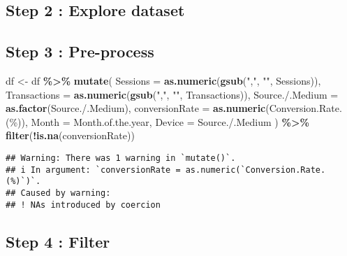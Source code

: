 \documentclass[
]{article}
\newenvironment{Shaded}{\begin{snugshade}}{\end{snugshade}}
\newcommand{\AttributeTok}[1]{\textcolor[rgb]{0.13,0.29,0.53}{#1}}
\newcommand{\FunctionTok}[1]{\textcolor[rgb]{0.13,0.29,0.53}{\textbf{#1}}}
\newcommand{\NormalTok}[1]{#1}
\newcommand{\OtherTok}[1]{\textcolor[rgb]{0.56,0.35,0.01}{#1}}
\newcommand{\SpecialCharTok}[1]{\textcolor[rgb]{0.81,0.36,0.00}{\textbf{#1}}}
\newcommand{\StringTok}[1]{\textcolor[rgb]{0.31,0.60,0.02}{#1}}
\begin{document}
\subsection{Step 2 : Explore dataset}\label{step-2-explore-dataset-1}

\subsection{Step 3 : Pre-process}\label{step-3-pre-process}

\begin{Shaded}
\begin{Highlighting}[]
\NormalTok{df }\OtherTok{\textless{}{-}}\NormalTok{ df }\SpecialCharTok{\%\textgreater{}\%}
  \FunctionTok{mutate}\NormalTok{(}
    \AttributeTok{Sessions =} \FunctionTok{as.numeric}\NormalTok{(}\FunctionTok{gsub}\NormalTok{(}\StringTok{","}\NormalTok{, }\StringTok{""}\NormalTok{, Sessions)),}
    \AttributeTok{Transactions =} \FunctionTok{as.numeric}\NormalTok{(}\FunctionTok{gsub}\NormalTok{(}\StringTok{","}\NormalTok{, }\StringTok{""}\NormalTok{, Transactions)),}
    \StringTok{\textasciigrave{}}\AttributeTok{Source./.Medium}\StringTok{\textasciigrave{}} \OtherTok{=} \FunctionTok{as.factor}\NormalTok{(}\StringTok{\textasciigrave{}}\AttributeTok{Source./.Medium}\StringTok{\textasciigrave{}}\NormalTok{),}
    \AttributeTok{conversionRate =} \FunctionTok{as.numeric}\NormalTok{(}\StringTok{\textasciigrave{}}\AttributeTok{Conversion.Rate.(\%)}\StringTok{\textasciigrave{}}\NormalTok{),}
    \AttributeTok{Month =}\NormalTok{ Month.of.the.year,}
    \AttributeTok{Device =} \StringTok{\textasciigrave{}}\AttributeTok{Source./.Medium}\StringTok{\textasciigrave{}} 
\NormalTok{  ) }\SpecialCharTok{\%\textgreater{}\%}
  \FunctionTok{filter}\NormalTok{(}\SpecialCharTok{!}\FunctionTok{is.na}\NormalTok{(conversionRate)) }
\end{Highlighting}
\end{Shaded}

\begin{verbatim}
## Warning: There was 1 warning in `mutate()`.
## i In argument: `conversionRate = as.numeric(`Conversion.Rate.(%)`)`.
## Caused by warning:
## ! NAs introduced by coercion
\end{verbatim}

\subsection{Step 4 : Filter}\label{step-4-filter}
\end{document}
